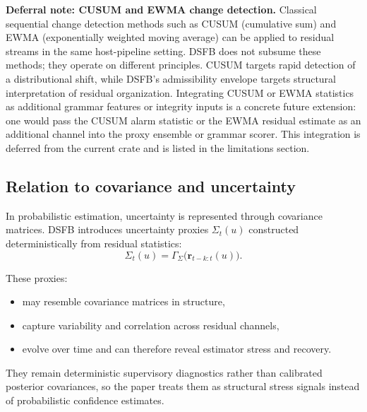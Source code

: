 \documentclass[11pt]{article}
\theoremstyle{definition}
\theoremstyle{plain}
\newenvironment{remarkbox}{%
  \begin{tcolorbox}[colback=blue!4,colframe=black!30,boxrule=0.4pt,%
    left=4pt,right=4pt,top=3pt,bottom=3pt,parbox=false]%
}{%
  \end{tcolorbox}%
}
\begin{document}
\begin{remarkbox}
\textbf{Deferral note: CUSUM and EWMA change detection.}
Classical sequential change detection methods such as CUSUM (cumulative sum) and EWMA (exponentially weighted moving average) can be applied to residual streams in the same host-pipeline setting. DSFB does not subsume these methods; they operate on different principles. CUSUM targets rapid detection of a distributional shift, while DSFB's admissibility envelope targets structural interpretation of residual organization. Integrating CUSUM or EWMA statistics as additional grammar features or integrity inputs is a concrete future extension: one would pass the CUSUM alarm statistic or the EWMA residual estimate as an additional channel into the proxy ensemble or grammar scorer. This integration is deferred from the current crate and is listed in the limitations section.
\end{remarkbox}


\subsection{Relation to covariance and uncertainty}

In probabilistic estimation, uncertainty is represented through covariance matrices. DSFB introduces uncertainty proxies $\Sigma_t(u)$ constructed deterministically from residual statistics:
\begin{equation}
\Sigma_t(u)=\Gamma_\Sigma\!\bigl(\mathbf{r}_{t-k:t}(u)\bigr).
\end{equation}

These proxies:
\begin{itemize}[leftmargin=1.5em]
    \item may resemble covariance matrices in structure,
    \item capture variability and correlation across residual channels,
    \item evolve over time and can therefore reveal estimator stress and recovery.
\end{itemize}

They remain deterministic supervisory diagnostics rather than calibrated posterior covariances, so the paper treats them as structural stress signals instead of probabilistic confidence estimates.

\end{document}
